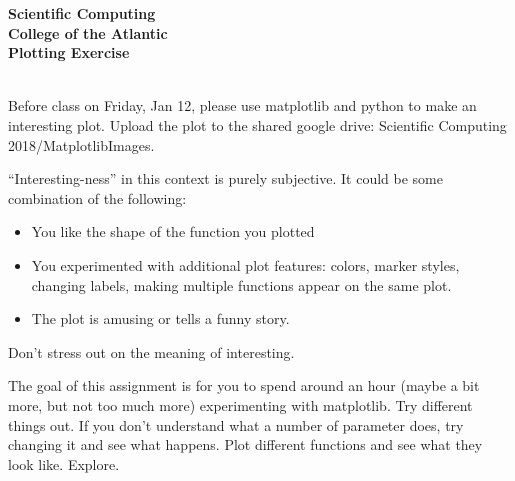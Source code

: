 \documentclass[12pt]{article}
\begin{document}
\pagestyle{empty}
 
\begin{center}
{\Large {\bf Scientific Computing}}\\
\medskip
{\large {\bf College of the Atlantic}}\\
\medskip
{\large {\bf Plotting Exercise}}\\
\medskip
\end{center}

\hspace{2mm}\\

\noindent Before class on Friday, Jan 12, please use matplotlib and
python to make an interesting plot.  Upload the plot to the shared
google drive: Scientific Computing 2018/MatplotlibImages.

``Interesting-ness'' in this context is purely subjective.  It could
be some combination of the following:

\begin{itemize}
\setlength{\itemsep}{-1mm}
  \item You like the shape of the function you plotted
  \item You experimented with additional plot features: colors, marker
    styles, changing labels, making multiple functions appear on the
    same plot.
  \item The plot is amusing or tells a funny story.
\end{itemize}
Don't stress out on the meaning of interesting.

The goal of this assignment is for you to spend around an hour (maybe
a bit more, but not too much more) experimenting with matplotlib.  Try
different things out.  If you don't understand what a number of
parameter does, try changing it and see what happens.  Plot different
functions and see what they look like.  Explore.
\end{document}
